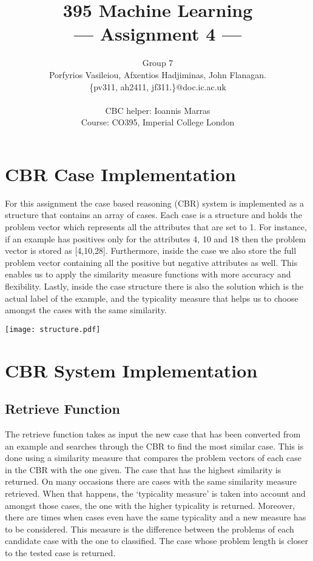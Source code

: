 \documentclass[a4paper,11pt]{article}
\title{395 Machine Learning\\\Large{--- Assignment 4 ---}}
\author{Group 7\\Porfyrios Vasileiou, Afxentios Hadjiminas, John Flanagan.\\
       \{pv311, ah2411, jf311.\}@doc.ic.ac.uk\\ \\
       \small{CBC helper: Ioannis Marras}\\
       \small{Course: CO395, Imperial College London}
}
\begin{document}
\maketitle

\section{CBR Case Implementation}
For this assignment the case based reasoning (CBR) system is implemented as a
structure that contains an array of cases. Each case is a structure and holds
the problem vector which represents all the attributes that are set to 1. For
instance, if an example has positives only for the attributes 4, 10 and 18 then
the problem vector is stored as [4,10,28]. Furthermore, inside the case we also
store the full problem vector containing all the positive but negative
attributes as well. This enables us to apply the similarity measure functions
with more accuracy and flexibility. Lastly, inside the case structure there is
also the solution which is the actual label of the example, and the typicality
measure that helps us to choose amongst the cases with the same similarity.

\begin{center}
    \texttt{[image: structure.pdf]}
\end{center}
\section{CBR System Implementation}

\subsection{Retrieve Function}
The retrieve function takes as input the new case that has been converted from
an example and searches through the CBR to find the most similar case. This is
done using a similarity measure that compares the problem vectors of each case
in the CBR with the one given. The case that has the highest similarity is
returned. On many occasions there are cases with the same similarity measure
retrieved. When that happens, the ‘typicality measure’ is taken into account
and amongst those cases, the one with the higher typicality is returned.
Moreover, there are times when cases even have the same typicality and a new
measure has to be considered. This measure is the difference between the
problems of each candidate case with the one to classified. The case whose
problem length is closer to the tested case is returned.
\end{document}
